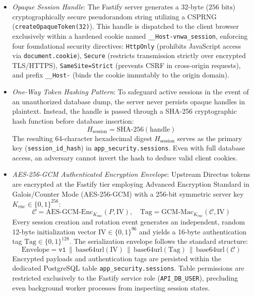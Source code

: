 \begin{itemize}
    \item[-] \textit{Opaque Session Handle}: The Fastify server generates a 32-byte ($256\text{ bits}$) cryptographically secure pseudorandom string utilizing a CSPRNG (\texttt{createOpaque}\allowbreak\texttt{Token(32)}). This handle is dispatched to the client browser exclusively within a hardened cookie named \texttt{\_\_Host-\allowbreak vnwa\_\allowbreak session}, enforcing four foundational security directives: \texttt{HttpOnly} (prohibits JavaScript access via \texttt{document.}\allowbreak\texttt{cookie}), \texttt{Secure} (restricts transmission strictly over encrypted TLS/HTTPS), \texttt{SameSite=Strict} (prevents CSRF in cross-origin requests), and prefix \texttt{\_\_Host-} (binds the cookie immutably to the origin domain).
    \item[-] \textit{One-Way Token Hashing Pattern}: To safeguard active sessions in the event of an unauthorized database dump, the server never persists opaque handles in plaintext. Instead, the handle is passed through a SHA-256 cryptographic hash function before database insertion:
    \begin{equation}
    \label{eq:session_hash_en}
    H_{\text{session}} = \text{SHA-256}(\text{handle})
    \end{equation}
    The resulting 64-character hexadecimal digest $H_{\text{session}}$ serves as the primary key (\texttt{session\_}\allowbreak\texttt{id\_}\allowbreak\texttt{hash}) in \texttt{app\_security.}\allowbreak\texttt{sessions}. Even with full database access, an adversary cannot invert the hash to deduce valid client cookies.
    \item[-] \textit{AES-256-GCM Authenticated Encryption Envelope}: Upstream Directus tokens are encrypted at the Fastify tier employing Advanced Encryption Standard in Galois/Counter Mode (AES-256-GCM) with a 256-bit symmetric server key $K_{\text{enc}} \in \{0, 1\}^{256}$:
    \begin{equation}
    \label{eq:aes_gcm_en}
    \mathcal{C} = \text{AES-GCM-Enc}_{K_{\text{enc}}}(P, \text{IV}), \quad \text{Tag} = \text{GCM-Mac}_{K_{\text{enc}}}(\mathcal{C}, \text{IV})
    \end{equation}
    Every session creation and rotation event generates an independent, random 12-byte initialization vector $\text{IV} \in \{0, 1\}^{96}$ and yields a 16-byte authentication tag $\text{Tag} \in \{0, 1\}^{128}$. The serialization envelope follows the standard structure:
    \begin{equation}
    \label{eq:envelope_format_en}
    \text{Envelope} = \texttt{v1} \,\|\, \text{base64url}(\text{IV}) \,\|\, \text{base64url}(\text{Tag}) \,\|\, \text{base64url}(\mathcal{C})
    \end{equation}
    Encrypted payloads and authentication tags are persisted within the dedicated PostgreSQL table \texttt{app\_security.}\allowbreak\texttt{sessions}. Table permissions are restricted exclusively to the Fastify service role (\texttt{API\_}\allowbreak\texttt{DB\_}\allowbreak\texttt{USER}), precluding even background worker processes from inspecting session states.
\end{itemize}

